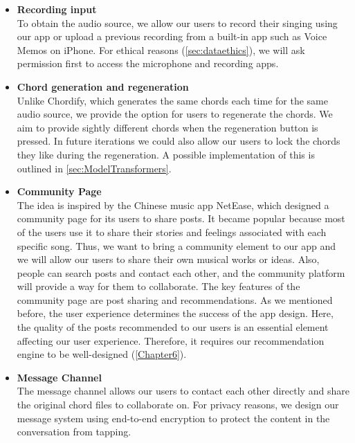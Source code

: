 \begin{itemize}
\item \textbf{Recording input}
\\ To obtain the audio source, we allow our users to record their singing using our app or upload a previous recording 
from a built-in app such as Voice Memos on iPhone. For ethical reasons (\cref{sec:dataethics}), we will ask permission first to access the microphone and recording apps.

\item \textbf{Chord generation and regeneration}
\\Unlike Chordify, which generates the same chords each time for the same audio source, we provide the option for users to regenerate the chords. We aim to provide sightly different chords when the regeneration button is pressed. 
In future iterations we could also allow our users to lock the chords they like during the regeneration. A possible implementation of this is outlined in \cref{sec:ModelTransformers}.

\item \textbf{Community Page}
\\The idea is inspired by the Chinese music app NetEase, which designed a community page for its users to share posts. 
It became popular because most of the users use it to share their stories and feelings associated with each specific song. 
Thus, we want to bring a community element to our app and we will allow our users to share their own musical works or ideas. 
Also, people can search posts and contact each other, and the community platform will provide a way for them to collaborate. 
The key features of the community page are post sharing and recommendations.
As we mentioned before, the user experience determines the success of the app design. 
Here, the quality of the posts recommended to our users is an essential element affecting our user experience. 
Therefore, it requires our recommendation engine to be well-designed (\cref{Chapter6}).

\item \textbf{Message Channel}
\\The message channel allows our users to contact each other directly and share the original chord files to collaborate on. For privacy reasons, we design our message system using end-to-end encryption to protect the content in the conversation from tapping.

\end{itemize}

